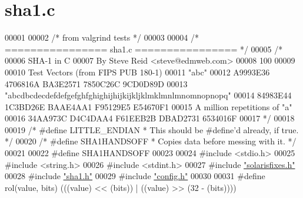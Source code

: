 \hypertarget{sha1_8c_source}{}\section{sha1.\+c}
\label{sha1_8c_source}

\begin{DoxyCode}
00001 
00002 \textcolor{comment}{/* from valgrind tests */}
00003 
00004 \textcolor{comment}{/* ================ sha1.c ================ */}
00005 \textcolor{comment}{/*}
00006 \textcolor{comment}{SHA-1 in C}
00007 \textcolor{comment}{By Steve Reid <steve@edmweb.com>}
00008 \textcolor{comment}{100%
00009 \textcolor{comment}{}
00010 \textcolor{comment}{Test Vectors (from FIPS PUB 180-1)}
00011 \textcolor{comment}{"abc"}
00012 \textcolor{comment}{  A9993E36 4706816A BA3E2571 7850C26C 9CD0D89D}
00013 \textcolor{comment}{"abcdbcdecdefdefgefghfghighijhijkijkljklmklmnlmnomnopnopq"}
00014 \textcolor{comment}{  84983E44 1C3BD26E BAAE4AA1 F95129E5 E54670F1}
00015 \textcolor{comment}{A million repetitions of "a"}
00016 \textcolor{comment}{  34AA973C D4C4DAA4 F61EEB2B DBAD2731 6534016F}
00017 \textcolor{comment}{*/}
00018 
00019 \textcolor{comment}{/* #define LITTLE\_ENDIAN * This should be #define'd already, if true. */}
00020 \textcolor{comment}{/* #define SHA1HANDSOFF * Copies data before messing with it. */}
00021 
00022 \textcolor{preprocessor}{#}\textcolor{preprocessor}{define} \textcolor{preprocessor}{SHA1HANDSOFF}
00023 
00024 \textcolor{preprocessor}{#}\textcolor{preprocessor}{include} \textcolor{preprocessor}{<}\textcolor{preprocessor}{stdio}\textcolor{preprocessor}{.}\textcolor{preprocessor}{h}\textcolor{preprocessor}{>}
00025 \textcolor{preprocessor}{#}\textcolor{preprocessor}{include} \textcolor{preprocessor}{<}\textcolor{preprocessor}{string}\textcolor{preprocessor}{.}\textcolor{preprocessor}{h}\textcolor{preprocessor}{>}
00026 \textcolor{preprocessor}{#}\textcolor{preprocessor}{include} \textcolor{preprocessor}{<}\textcolor{preprocessor}{stdint}\textcolor{preprocessor}{.}\textcolor{preprocessor}{h}\textcolor{preprocessor}{>}
00027 \textcolor{preprocessor}{#}\textcolor{preprocessor}{include} \hyperlink{solarisfixes_8h}{"solarisfixes.h"}
00028 \textcolor{preprocessor}{#}\textcolor{preprocessor}{include} \hyperlink{sha1_8h}{"sha1.h"}
00029 \textcolor{preprocessor}{#}\textcolor{preprocessor}{include} \hyperlink{config_8h}{"config.h"}
00030 
00031 \textcolor{preprocessor}{#}\textcolor{preprocessor}{define} \textcolor{preprocessor}{rol}\textcolor{preprocessor}{(}\textcolor{preprocessor}{value}\textcolor{preprocessor}{,} \textcolor{preprocessor}{bits}\textcolor{preprocessor}{)} \textcolor{preprocessor}{(}\textcolor{preprocessor}{(}\textcolor{preprocessor}{(}\textcolor{preprocessor}{value}\textcolor{preprocessor}{)} \textcolor{preprocessor}{<<} \textcolor{preprocessor}{(}\textcolor{preprocessor}{bits}\textcolor{preprocessor}{)}\textcolor{preprocessor}{)} \textcolor{preprocessor}{|} \textcolor{preprocessor}{(}\textcolor{preprocessor}{(}\textcolor{preprocessor}{value}\textcolor{preprocessor}{)} \textcolor{preprocessor}{>>} \textcolor{preprocessor}{(}32 \textcolor{preprocessor}{-} \textcolor{preprocessor}{(}\textcolor{preprocessor}{bits}\textcolor{preprocessor}{)}\textcolor{preprocessor}{)}\textcolor{preprocessor}{)}\textcolor{preprocessor}{)}
}
\end{DoxyCode}
